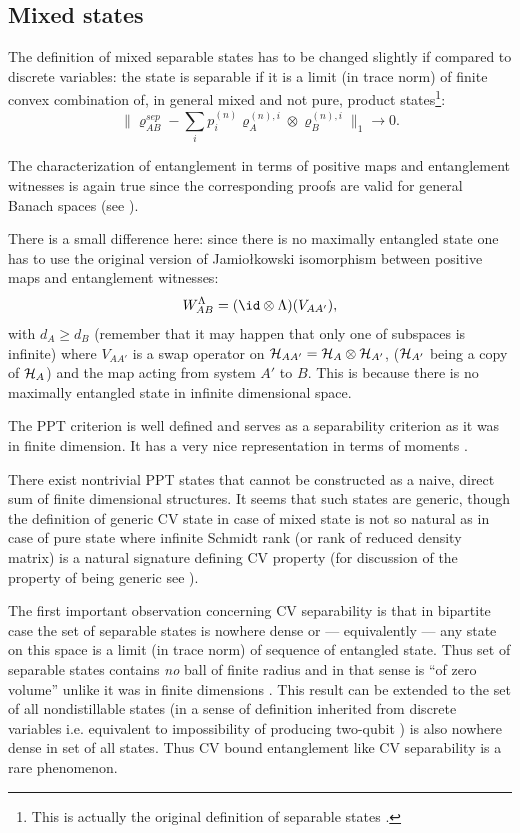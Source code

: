 \documentclass[twocolumn,aps,rmp]{revtex4}
\begin{document}
\subsection{Mixed states}

The definition of mixed separable states has to be changed slightly if
compared to discrete variables: the state is separable if it is a
limit (in trace norm) of finite convex combination of, in general
mixed and not pure, product states\footnote{This is actually the
  original definition of separable states \cite{Werner1989}.}:
\begin{equation}
\|\varrho^{sep}_{AB} - \sum_{i}p_{i}^{(n)} \varrho^{(n),i}_{A}
\otimes \varrho^{(n),i}_{B}\|_1 \rightarrow 0.
\end{equation}

The characterization of entanglement in terms of positive maps and
entanglement witnesses is again true since the corresponding proofs
are valid for general Banach spaces (see \cite{sep1996}).

There is a small difference here: since there is no maximally
entangled state one has to use the original version of Jamio\l{}kowski
isomorphism between positive maps and entanglement witnesses:
\begin{equation}
W^{\Lambda}_{AB}=(\id \otimes \Lambda)(V_{AA'}),
\end{equation}
with $d_{A}\geq d_{B}$ (remember that it may happen that only one of
subspaces is infinite) where $V_{AA'}$ is a swap operator on ${\cal
  H}_{AA'}={\cal H}_{A}\otimes {\cal H}_{A'}$, (${\cal H}_{A'}$ being
a copy of ${\cal H}_{A}$) and the map acting from system $A'$ to $B$.
This is because there is no maximally entangled state in infinite
dimensional space.

The PPT criterion is well defined and serves as a separability
criterion as it was in finite dimension. It has a very nice
representation in terms of moments \cite{SV}.

There exist nontrivial PPT states \cite{boundCV} that cannot be
constructed as a naive, direct sum of finite dimensional structures.
It seems that such states are generic, though the definition of
generic CV state in case of mixed state is not so natural as in case
of pure state where infinite Schmidt rank (or rank of reduced density
matrix) is a natural signature defining CV property (for discussion of
the property of being generic see \cite{BoundCon}).

The first important observation concerning CV separability is
\cite{CliftonHalvorson02} that in bipartite case the set of separable
states is nowhere dense or --- equivalently --- any state on this
space is a limit (in trace norm) of sequence of entangled state.  Thus
set of separable states contains {\it no} ball of finite radius and in
that sense is ``of zero volume'' unlike it was in finite dimensions
\cite{ZyczkowskiHSP-vol}.  This result can be extended \cite{BoundCon}
to the set of all nondistillable states (in a sense of definition
inherited from discrete variables i.e. equivalent to impossibility of
producing two-qubit \singlets) is also nowhere dense in set of all
states.  Thus CV bound entanglement like CV separability is a rare
phenomenon.
\end{document}
